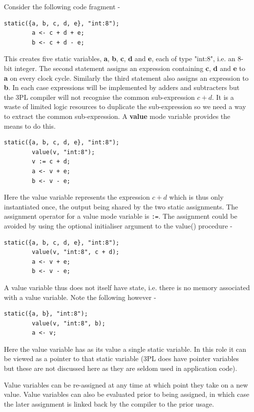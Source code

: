 \documentclass[10pt,a4paper,twoside,fleqn]{article}
\newcommand{\kwd}[1]{{\bf #1}} %
\newcommand{\var}[1]{{\bf #1}} %
\begin{document}
   Consider the following code fragment -
    \begin{lstlisting}[language=threepl]
        static({a, b, c, d, e}, "int:8");
        a <- c + d + e;
        b <- c + d - e;
    \end{lstlisting}
    This creates five static variables, \var{a}, \var{b}, \var{c}, \var{d}
    and \var{e}, each of
    type "int:8", i.e. an 8-bit integer.
    The second statement assigns an expression containing \var{c}, \var{d}
    and \var{e} to \var{a} on every clock cycle. Similarly the third statement
    also assigns an expression to \var{b}. In each case expressions will be
    implemented by adders and subtracters but the 3PL compiler will not recognise
    the common sub-expression $c + d$. It is a waste of limited logic resources
    to duplicate the sub-expression so we need a way to extract the common
    sub-expression. A \kwd{value} mode variable provides the means to do this.
    \begin{lstlisting}[language=threepl]
        static({a, b, c, d, e}, "int:8");
        value(v, "int:8");
        v := c + d;
        a <- v + e;
        b <- v - e;
    \end{lstlisting}
    Here the value variable represents the expression $c + d$ which is thus
    only instantiated once, the output being shared by the two static assignments.
    The assignment operator for a value mode variable is \verb':='.
    The assignment could be avoided by using the optional initialiser argument
    to the value() procedure -
    \begin{lstlisting}[language=threepl]
        static({a, b, c, d, e}, "int:8");
        value(v, "int:8", c + d);
        a <- v + e;
        b <- v - e;
    \end{lstlisting}

    A value variable thus does not itself have state, i.e. there is no memory
    associated with a value variable. Note the following however -
    \begin{lstlisting}[language=threepl]
        static({a, b}, "int:8");
        value(v, "int:8", b);
        a <- v;
    \end{lstlisting}
    Here the value variable has as its value a single static variable. In this
    role it can be viewed as a pointer to that static variable (3PL does have
    pointer variables but these are not discussed here as they are seldom used
    in application code).
    
    Value variables can be re-assigned at any time at which point they take on a
    new value. Value variables can also be evaluated prior to being assigned, in
    which case the later assignment is linked back by the compiler to the prior
    usage.
   
\end{document}
